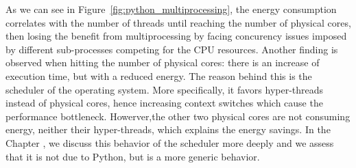 As we can see in Figure~\ref{fig:python_multiprocessing}, the energy consumption correlates with the number of threads until reaching the number of physical cores, then losing the benefit from multiprocessing by facing concurency issues imposed by different sub-processes competing for the CPU resources.
Another finding is observed when hitting the number of physical cores: there is an increase of execution time, but with a reduced energy.
The reason behind this is the scheduler of the operating system.
More specifically, it favors hyper-threads instead of physical cores, hence increasing context switches which cause the performance bottleneck.
Howerver,the other two physical cores are not consuming energy, neither their hyper-threads, which explains the energy savings.
In the Chapter , %
we discuss this behavior of the scheduler more deeply and we assess that it is not due to Python, but is a more generic behavior.



\clearpage
